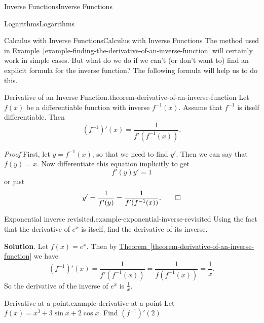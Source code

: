 \documentclass[10pt,]{book}
\makeatletter
\renewcommand*{\proofname}{Proof}
\renewenvironment{proof}[1][\proofname]{\par
  \pushQED{\qed}%
  \normalfont \topsep6\p@\@plus6\p@\relax
  \trivlist
  \item\relax
    {\itshape
    #1\@addpunct{.}}\hspace\labelsep\ignorespaces
}{%
  \popQED\endtrivlist\@endpefalse
}
\numberwithin{equation}{section}
\makeatother
\begin{document}
\begin{chapterptx}{Inverse Functions}{}{Inverse Functions}{}{}
\begin{sectionptx}{Logarithms}{}{Logarithms}{}{}
\begin{subsectionptx}{Calculus with Inverse Functions}{}{Calculus with Inverse Functions}{}{}
\hypertarget{p-210}{}%
The method used in \hyperref[example-finding-the-derivative-of-an-inverse-function]{Example~\ref{example-finding-the-derivative-of-an-inverse-function}} will certainly work in simple cases. But what do we do if we can't (or don't want to) find an explicit formula for the inverse function? The following formula will help us to do this.%
\begin{theorem}{Derivative of an Inverse Function.}{}{theorem-derivative-of-an-inverse-function}%
\hypertarget{p-211}{}%
Let \(f(x)\) be a differentiable function with inverse \(f^{-1}(x)\). Assume that \(f^{-1}\) is itself differentiable. Then%
\begin{equation*}
(f^{-1})'(x) = \frac{1}{f'(f^{-1}(x))}.
\end{equation*}
%
\end{theorem}
\begin{proof}\hypertarget{proof-4}{}
\hypertarget{p-212}{}%
First, let \(y = f^{-1}(x)\), so that we need to find \(y'\). Then we can say that \(f(y) = x\). Now differentiate this equation implicitly to get%
\begin{equation*}
f'(y)y' = 1
\end{equation*}
or just%
\begin{equation*}
y' = \frac{1}{f'(y)} = \frac{1}{f'(f^{-1}(x))}.\qedhere
\end{equation*}
%
\end{proof}
\begin{example}{Exponential inverse revisited.}{example-exponential-inverse-revisited}%
\hypertarget{p-213}{}%
Using the fact that the derivative of \(e^{x}\) is itself, find the derivative of its inverse.%
\par\smallskip%
\noindent\textbf{Solution}.\hypertarget{solution-46}{}\quad%
\hypertarget{p-214}{}%
Let \(f(x) = e^{x}\). Then by \hyperref[theorem-derivative-of-an-inverse-function]{Theorem~\ref{theorem-derivative-of-an-inverse-function}} we have%
\begin{equation*}
(f^{-1})'(x) = \frac{1}{f'(f^{-1}(x))} = \frac{1}{f(f^{-1}(x))} = \frac{1}{x}.
\end{equation*}
So the derivative of the inverse of \(e^{x}\) is \(\frac{1}{x}\).%
\end{example}
\begin{example}{Derivative at a point.}{example-derivative-at-a-point}%
\hypertarget{p-215}{}%
Let \(f(x) = x^{3} + 3\sin x + 2\cos x\). Find \((f^{-1})'(2)\)%
\par\smallskip%

\end{example}
\end{subsectionptx}
\end{sectionptx}
\end{chapterptx}
\end{document}
